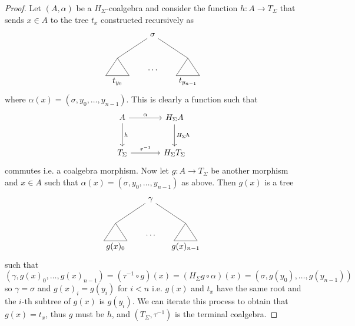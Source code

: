 \documentclass[letterpaper, 11pt, oneside]{memoir}
\theoremstyle{myteo}
\numberwithin{equation}{section}
\begin{document}
\begin{proof}
  Let \((A, \alpha)\) be a \(H_\Sigma\)-coalgebra and consider the function \(h: A \to T_\Sigma\) that sends \(x \in A\) to the tree \(t_x\) constructed recursively as
  \begin{equation*}
    \begin{tikzpicture}
      \node (t1) at (0,-0.5){\(t_{y_0}\)};
      \node (t2) at (1.5,0){\(\ldots\)};
      \node (t3) at (3,-0.5){\(t_{y_{n-1}}\)};
      \node (s) at (1.5, 1.5){\(\sigma\)};
      
      \draw[-] (0,0.5) -- (.5, -.25) -- (-.5, -.25) -- (0, .5);
      \draw[-] (3,0.5) -- (3.5, -.25) -- (2.5, -.25) -- (3, .5);

      \draw[-] (s) -- (0,0.5);
      \draw[-] (s) -- (3,0.5);
    \end{tikzpicture}
  \end{equation*}
  where \(\alpha(x) = (\sigma, y_0, \ldots, y_{n-1})\).
  This is clearly a function such that
  \begin{equation*}
    \begin{tikzcd}[sep=large]
      A \ar[r, "\alpha"] \ar[d, "h"] & H_\Sigma A \ar[d, "H_\Sigma h"] \\
      T_\Sigma \ar[r, "\tau^{-1}"] & H_\Sigma T_\Sigma
    \end{tikzcd}
  \end{equation*}
  commutes i.e. a coalgebra morphism.
  Now let \(g:A \to T_\Sigma\) be another morphism and \(x \in A\) such that \(\alpha(x) = (\sigma, y_0, \ldots, y_{n-1})\) as above.
  Then \(g(x)\) is a tree
  \begin{equation*}
    \begin{tikzpicture}
      \node (t1) at (0,-0.5){\(g(x)_0\)};
      \node (t2) at (1.5,0){\(\ldots\)};
      \node (t3) at (3,-0.5){\(g(x)_{n-1}\)};
      \node (s) at (1.5, 1.5){\(\gamma\)};
      
      \draw[-] (0,0.5) -- (.5, -.25) -- (-.5, -.25) -- (0, .5);
      \draw[-] (3,0.5) -- (3.5, -.25) -- (2.5, -.25) -- (3, .5);

      \draw[-] (s) -- (0,0.5);
      \draw[-] (s) -- (3,0.5);
    \end{tikzpicture}
  \end{equation*}
  such that
  \begin{equation*}
    (\gamma, g(x)_0, \ldots, g(x)_{n-1}) = (\tau^{-1} \circ g)(x) = (H_\Sigma g \circ \alpha)(x) = (\sigma, g(y_0), \ldots, g(y_{n-1}))
  \end{equation*}
  so \(\gamma = \sigma\) and \(g(x)_i = g(y_i)\) for \(i < n\) i.e. \(g(x)\) and \(t_x\) have the same root and the \(i\)-th subtree of \(g(x)\) is \(g(y_i)\).
  We can iterate this process to obtain that \(g(x) = t_x\), thus \(g\) must be \(h\), and \((T_\Sigma, \tau^{-1})\) is the terminal coalgebra.
\end{proof}
\end{document}

